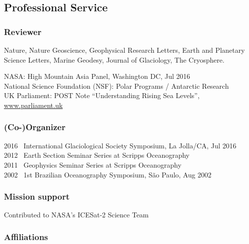 \documentclass[12pt,]{scrartcl}
\begin{document}
\subsection{Professional Service}

\subsubsection{Reviewer}

Nature, Nature Geoscience, Geophysical Research Letters, Earth and Planetary Science Letters, Marine Geodesy, Journal of Glaciology, The Cryosphere.

NASA: High Mountain Asia Panel, Washington DC, Jul 2016 \\
National Science Foundation (NSF): Polar Programs / Antarctic Research \\
UK Parliament: POST Note ``Understanding Rising Sea Levels'', \href{https://researchbriefings.parliament.uk/ResearchBriefing/Summary/POST-PN-0555}{www.parliament.uk}

\subsubsection{(Co-)Organizer}

2016 \, International Glaciological Society Symposium, La Jolla/CA, Jul 2016 \\
2012 \, Earth Section Seminar Series at Scripps Oceanography \\
2011 \, Geophysics Seminar Series at Scripps Oceanography \\
2002 \, 1st Brazilian Oceanography Symposium, S\~ao Paulo, Aug 2002

\subsubsection{Mission support}

Contributed to NASA's ICESat-2 Science Team



\subsubsection{Affiliations}
\end{document}
